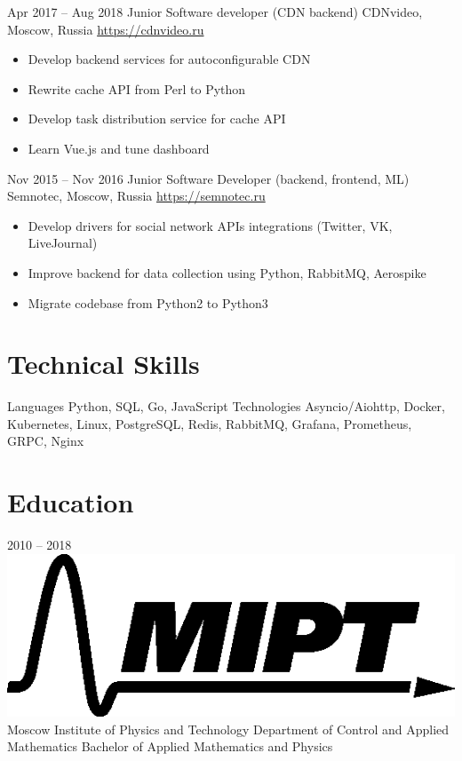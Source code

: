 \documentclass[11pt,a4paper]{moderncv}
\begin{document}
  \cventry
    {Apr 2017 – Aug 2018}
    {Junior Software developer (CDN backend)}
    {CDNvideo, Moscow, Russia}
    {\url{https://cdnvideo.ru}}
    {}
    {
      \begin{itemize}\setlength\itemindent{6pt}
        \item Develop backend services for autoconfigurable CDN
        \item Rewrite cache API from Perl to Python
        \item Develop task distribution service for cache API
        \item Learn Vue.js and tune dashboard
      \end{itemize}
    }

  \cventry
    {Nov 2015 – Nov 2016}
    {Junior Software Developer (backend, frontend, ML)}
    {Semnotec, Moscow, Russia}
    {\url{https://semnotec.ru}}
    {}
    {
      \begin{itemize}\setlength\itemindent{6pt}
        \item Develop drivers for social network APIs integrations (Twitter, VK, LiveJournal)
        \item Improve backend for data collection using Python, RabbitMQ, Aerospike
        \item Migrate codebase from Python2 to Python3
      \end{itemize}
    }

\section{Technical Skills}
  \cvline
    {Languages}{
      Python,
      SQL,
      Go,
      JavaScript
    }
  \cvline
    {Technologies}{
      Asyncio/Aiohttp,
      Docker,
      Kubernetes,
      Linux,
      PostgreSQL,
      Redis,
      RabbitMQ,
      Grafana,
      Prometheus,
      GRPC,
      Nginx
    }

\section{Education}
  \vspace*{-5mm}
  \cventry
    {2010 – 2018}
    {\includegraphics[scale=0.25]{mipt} Moscow Institute of Physics and Technology}
    {}
    {}{}
    {
      Department of Control and Applied Mathematics \newline{}
      Bachelor of Applied Mathematics and Physics \newline{}
    }
    {}
\end{document}
